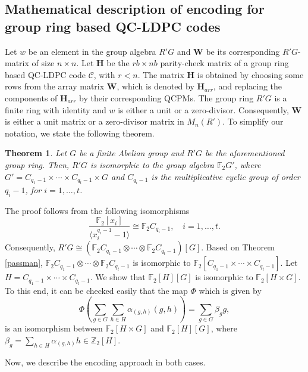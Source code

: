 \documentclass[journal,draftclsnofoot,onecolumn,12pt,twoside]{IEEEtran}
\newtheorem{theorem}{Theorem}
\begin{document}
\subsection{Mathematical description of encoding for group ring based QC-LDPC codes}
Let $w$ be an element in the group algebra $R'G$ and $\mathbf{W}$ be its corresponding  $R'G$-matrix of size $n\times n$.
Let $\mathbf{H}$  be the $rb\times nb$ parity-check matrix of a group ring based QC-LDPC code $\mathcal{C}$, with $r<n$. The matrix $\mathbf{H}$ is obtained by choosing some rows from the array matrix $\mathbf{W}$, which is denoted by $\mathbf{H}_{arr}$, and replacing the components of $\mathbf{H}_{arr}$ by their corresponding QCPMs. The group ring $R'G$ is a finite ring with identity and $w$  is either a unit or a zero-divisor. Consequently, $\mathbf{W}$ is either a unit matrix or a zero-divisor matrix in $M_n(R')$.  To simplify our notation, we state the following theorem.
\begin{theorem}\label{th_12}
Let $G$ be a finite Abelian group and $R'G$ be the aforementioned group ring. Then, $R'G$ is isomorphic to the group algebra $\mathbb{F}_2 G'$, where $G'=C_{q_1-1}\times \cdots \times C_{q_t-1}\times G$ and  $C_{q_i-1}$ is the multiplicative cyclic group of order $q_i-1$, for $i=1,\ldots, t$.
\end{theorem}
\begin{IEEEproof}
The proof follows from the following isomorphisms
$$\frac{\mathbb{F}_2[x_i]}{\langle x_i^{q_i-1}-1 \rangle}\cong \mathbb{F}_2C_{q_i-1},\quad i=1,\ldots, t.$$
Consequently,
$R'G\cong  (\mathbb{F}_2C_{q_1-1}\otimes\cdots \otimes \mathbb{F}_2C_{q_t-1})[G]$.
Based on Theorem \ref{passman},  $\mathbb{F}_2C_{q_1-1}\otimes\cdots \otimes \mathbb{F}_2C_{q_t-1}$ is isomorphic to $\mathbb{F}_2\left[C_{q_1-1}\times \cdots \times C_{q_t-1} \right]$. Let $H=C_{q_1-1}\times \cdots \times C_{q_t-1}$. We show that $\mathbb{F}_2[H][G]$ is isomorphic to $\mathbb{F}_2[H\times G]$. To this end, it can be checked easily that the map $\Phi$ which is given by
$$\Phi\left(\sum_{g\in G}\sum_{h\in H}\alpha_{(g,h)}(g,h)\right)=\sum_{g\in G}\beta_g g,$$
is an isomorphism between $\mathbb{F}_2[H\times G]$ and $\mathbb{F}_2[H][G]$, where
$\beta_g=\sum_{h\in H}\alpha_{(g,h)} h\in \mathbb{Z}_2[H]$.
\end{IEEEproof}



Now, we describe the encoding approach in  both cases.
\end{document}
